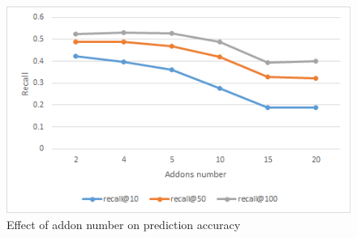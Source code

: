 \documentclass[11pt,oneside]{book}
\begin{document}
\begin{figure}[t]
\centering
\includegraphics[scale=1,angle=0]{figures/addonsNumberGraph.png}
\caption{Effect of addon number on prediction accuracy}
\label{fig:addonsNumberGraph}
\end{figure}

\end{document}

